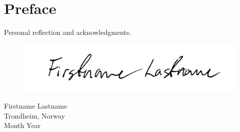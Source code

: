 \chapter*{Preface}
\noindent 

Personal reflection and acknowledgments.

\vspace{.8cm}
\begin{figure}[h]
	\raggedleft
	\includegraphics[width=0.5\linewidth]{img/signature.pdf}
\end{figure}
\begin{flushright}
	\vspace{-0.8cm}
	Firstname Lastname \\
	Trondheim, Norway\\
	Month Year
\end{flushright}

\cleardoublepage